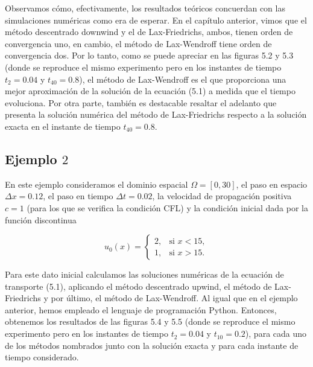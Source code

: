 Observamos cómo, efectivamente, los resultados teóricos concuerdan
con las simulaciones numéricas como era de esperar.
En el capítulo anterior, vimos que el método descentrado downwind y
el de Lax-Friedrichs, ambos, tienen orden de convergencia uno, en
cambio, el método de Lax-Wendroff tiene orden de convergencia dos.
Por lo tanto, como se puede apreciar en las ﬁguras 5.2 y 5.3
(donde se reproduce el mismo experimento pero en los instantes de
tiempo $t_{2}=0.04$ y $t_{40}=0.8$), el método de Lax-Wendroff es el
que proporciona una mejor aproximación de la solución de la ecuación
(5.1) a medida que el tiempo evoluciona.
Por otra parte, también es destacable resaltar el adelanto que
presenta la solución numérica del método de Lax-Friedrichs respecto a
la solución exacta en el instante de tiempo $t_{40}=0.8$.

\subsection*{Ejemplo $2$}

En este ejemplo consideramos el dominio espacial
$\Omega=\left[0,30\right]$, el paso en espacio $\Delta x=0.12$, el
paso en tiempo $\Delta t=0.02$, la velocidad de propagación positiva
$c=1$ (para los que se veriﬁca la condición CFL) y la condición
inicial dada por la función discontinua

\begin{equation*}
    u_{0}\left(x\right)=
    \begin{cases}
        2, & \text{si }x<15, \\
        1, & \text{si }x>15.
    \end{cases}
\end{equation*}

Para este dato inicial calculamos las soluciones numéricas de la
ecuación de transporte (5.1), aplicando el método descentrado upwind,
el método de Lax-Friedrichs y por último, el método de Lax-Wendroff.
Al igual que en el ejemplo anterior, hemos empleado el lenguaje de
programación Python.
Entonces, obtenemos los resultados de las ﬁguras 5.4 y 5.5 (donde se
reproduce el mismo experimento pero en los instantes de tiempo
$t_{2}=0.04$ y $t_{10}=0.2$), para cada uno de los métodos nombrados
junto con la solución exacta y para cada instante de tiempo
considerado.


